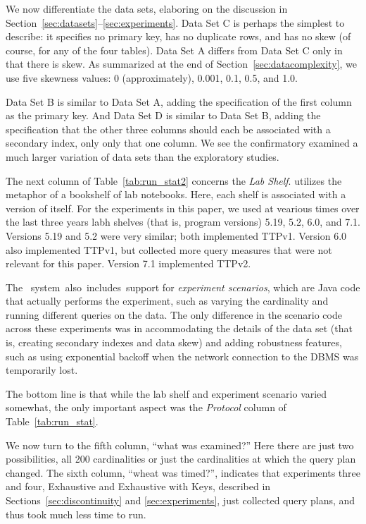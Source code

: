 \documentclass[prodmode,acmtods]{acmsmall}
\def\azdb{\doubleblind{\hbox{\sc AZDBLab}}{\hbox{\sc DBLab}}}
\begin{document}
We now differentiate the data sets, elaboring on the discussion in Section~\ref{sec:datasets}--\ref{sec:experiments}. Data Set C is perhaps the simplest to
describe: it specifies no primary key, has no duplicate rows, and has no skew
(of course, for any of the four tables). Data Set A differs from Data Set C
only in that there is skew.  As summarized at the end of
Section~\ref{sec:datacomplexity}, we use five skewness values: 0
(approximately), 0.001, 0.1, 0.5, and 1.0.

Data Set B is similar to Data Set A, adding the specification of the first
column as the primary key. And Data Set D is similar to Data Set B, adding
the specification that the other three columns should each be associated
with a secondary index, only only that one column.
We see the confirmatory examined a much larger variation of data sets than
the exploratory studies.

The next column of Table~\ref{tab:run_stat2} concerns the {\em Lab
  Shelf}. \hbox{\azdb} utilizes the metaphor of a bookshelf of lab
notebooks. Here, each shelf is associated with a version of \hbox{\azdb} itself. For the experiments in this paper, we used at vearious times over
the last three years labh shelves (that is, program versions) 5.19, 5.2,
6.0, and 7.1. Versions 5.19 and 5.2 were very similar; both implemented
TTPv1.  Version 6.0 also implemented TTPv1, but collected more query
measures that were not relevant for this paper. Version 7.1 implemented
TTPv2.

The \hbox{\azdb\ system also includes support} for {\em experiment scenarios}, which
are Java code that actually performs the experiment, such as varying the
cardinality and running different queries on the data. The only difference
in the scenario code across these experiments was in accommodating the
details of the data set (that is, creating secondary indexes and data skew)
and adding robustness features, such as using exponential backoff when the
network connection to the DBMS was temporarily lost.

The bottom line is that while the lab shelf and experiment scenario varied
somewhat, the only important aspect was the {\em Protocol} column of
Table~\ref{tab:run_stat}.

We now turn to the fifth column, ``what was examined?'' Here there are just two
possibilities, all 200 cardinalities or just the cardinalities at which the
query plan changed. The sixth column, ``wheat was timed?'', indicates that experiments three and four, Exhaustive and
Exhaustive with Keys, described in Sections~\ref{sec:discontinuity} and \ref{sec:experiments}, just
collected query plans, and thus took much less time to run.
\end{document}
